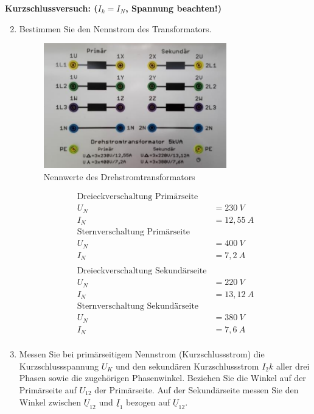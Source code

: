 \textbf{Kurzschlussversuch: ($I_k = I_N$, Spannung beachten!)}
\begin{enumerate}[label=\alph*)]
  \setcounter{enumi}{1}
  \item Bestimmen Sie den Nennstrom des Transformators.
        \begin{figure}[h!]
          \begin{center}
            \includegraphics[width=0.75\textwidth]{img/3.1.2.1.png}
          \end{center}
          \caption{Nennwerte des Drehstromtransformators}\label{img:3.1.2.1}
        \end{figure}
        \begin{align*}
          \text{Dreieckverschaltung Primärseite}   \\
          U_N & = 230\ V                           \\
          I_N & = 12,55\ A                         \\
          \text{Sternverschaltung Primärseite}     \\
          U_N & = 400\ V                           \\
          I_N & = 7,2\ A                           \\
          \\
          \text{Dreieckverschaltung Sekundärseite} \\
          U_N & = 220\ V                           \\
          I_N & = 13,12\ A                         \\
          \text{Sternverschaltung Sekundärseite}   \\
          U_N & = 380\ V                           \\
          I_N & = 7,6\ A                           \\
        \end{align*}
        \pagebreak[2]
  \item Messen Sie bei primärseitigem Nennstrom (Kurzschlussstrom) die
        Kurzschlussspannung $U_K$ und den sekundären Kurzschlussstrom $I_2k$ aller drei
        Phasen sowie die zugehörigen Phasenwinkel. Beziehen Sie die Winkel auf der
        Primärseite auf $U_{12}$ der Primärseite. Auf der Sekundärseite messen Sie den
        Winkel zwischen $\underline U_{12}$ und $\underline I_1$ bezogen auf
        $\underline U_{12}$.


\end{enumerate}
